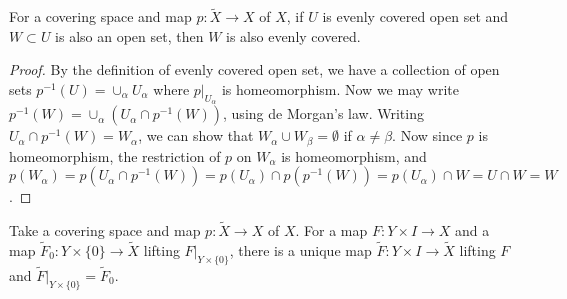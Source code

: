 \begin{lemma} For a covering space and map $p:\tilde{X}\rightarrow X$ of $X$, if $U$ is evenly covered open set and $W\subset U$ is also an open set, then $W$ is also evenly covered.
\end{lemma}
\begin{proof}
By the definition of evenly covered open set, we have a collection of open sets $p^{-1}(U)=\cup_{\alpha}U_\alpha$ where $p|_{U_\alpha}$ is homeomorphism. Now we may write $p^{-1}(W)=\cup_{\alpha}\left(U_\alpha\cap p^{-1}(W)\right)$, using de Morgan's law. Writing $U_\alpha\cap p^{-1}(W)=W_\alpha$, we can show that $W_\alpha\cup W_\beta=\emptyset$ if $\alpha\neq \beta$. Now since $p$ is homeomorphism, the restriction of $p$ on $W_\alpha$ is homeomorphism, and $p(W_\alpha)=p(U_\alpha\cap p^{-1}(W))=p(U_\alpha)\cap p(p^{-1}(W))=p(U_\alpha)\cap W=U\cap W=W$.
\end{proof}
\begin{lemma} Take a covering space and map $p:\tilde{X}\rightarrow X$ of $X$. For a map $F:Y\times I\rightarrow X$ and a map $\tilde{F}_0:Y\times\{0\}\rightarrow \tilde{X}$ lifting $F|_{Y\times \{0\}}$, there is a unique map $\tilde{F}:Y\times I\rightarrow \tilde{X}$ lifting $F$ and $\tilde{F}|_{Y\times \{0\}}=\tilde{F}_0$.
\end{lemma}
